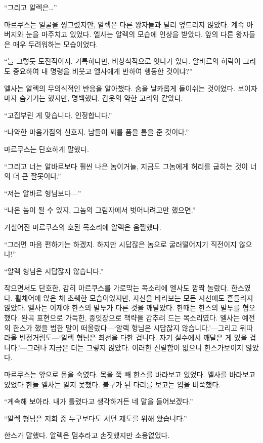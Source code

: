 ``그리고 알렉은\ldots''

마르쿠스는 얼굴을 찡그렸지만, 알렉은 다른 왕자들과 달리 엎드리지 않았다. 계속 아버지와 눈을 마주치고 있었다. 엘사는 알렉의 모습에 인상을 받았다. 앞의 다른 왕자들은 매우 두려워하는 모습이었다.

``늘 그렇듯 도전적이지. 기특하다만, 비상식적으로 엇나가 있다. 알바르의 허락이 그리도 중요하여 내 명령을 비웃고 엘사에게 반하여 행동한 것이냐?''

엘사는 알렉의 무의식적인 반응을 알아챘다. 숨을 날카롭게 들이쉬는 것이었다. 보이자마자 숨기기는 했지만, 명백했다. 갑옷의 약한 고리와 같았다.

`` 고집부린 게 맞습니다. 인정합니다.''

``나약한 마음가짐의 신호지. 남들이 꾀를 품을 틈을 준 것이다.''

마르쿠스는 단호하게 말했다.

``그리고 너는 알바르보다 훨씬 나은 놈이거늘, 지금도 그놈에게 허리를 굽히는 것이 너의 더 큰 잘못이다.''

``저는 알바르 형님보다—''

``나은 놈이 될 수 있지, 그놈의 그림자에서 벗어나려고만 했으면.''

거칠어진 마르쿠스의 호된 목소리에 알렉은 움찔했다.

``그러면 마음 편하기는 하겠지. 하지만 시답잖은 놈으로 굴러떨어지기 직전이지 않으냐!''

``알렉 형님은 시답잖지 않습니다.''

작으면서도 단호한, 감히 마르쿠스를 가로막는 목소리에 엘사도 깜짝 놀랐다. 한스였다. 휠체어에 앉은 채 초췌한 모습이었지만, 자신을 바라보는 모든 시선에도 흔들리지 않았다. 엘사는 이제야 한스의 말투가 다른 것을 깨달았다. 한때는 한스의 말투를 혐오했다. 완곡 표현으로 가득한, 종잇장으로 책략을 감추려 드는 목소리였다. 엘사는 예전의 한스가 했을 법한 말이 떠올랐다—`알렉 형님은 시답잖지 않습니다.'—그리고 뒤따라올 빈정거림도—`알렉 형님은 최선을 다한 겁니다. 자기 실수에서 깨달은 게 있을 겁니다.'—그러나 지금은 더는 그렇지 않았다. 이러한 신랄함이 없으니 한스가 보이지 않았다.

마르쿠스는 앞으로 몸을 숙였다. 목을 쭉 빼 한스를 바라보고 있었다. 엘사를 바라보고 있었다 한들 엘사는 알지 못했다. 불구가 된 다리를 보고는 입을 비쭉했다.

``계속해 보아라. 내가 틀렸다고 생각하거든 네 말을 들어보겠다.''

``알렉 형님은 저희 중 누구보다도 서던 제도를 위해 왔습니다.''

한스가 말했다. 알렉은 멈추라고 손짓했지만 소용없었다.


